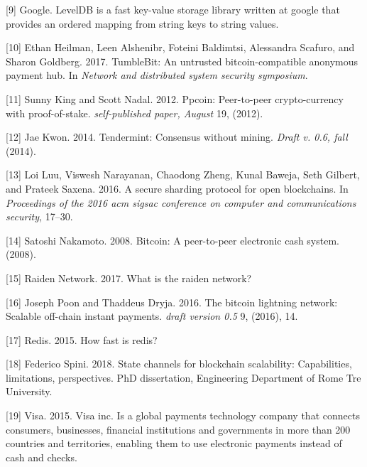 \documentclass[12pt,italian,]{book}
\begin{document}
\leavevmode\hypertarget{ref-googlele43:online}{}%
{[}9{]} Google. LevelDB is a fast key-value storage library written at google that provides an ordered mapping from string keys to string values.

\leavevmode\hypertarget{ref-heilman2017tumblebit}{}%
{[}10{]} Ethan Heilman, Leen Alshenibr, Foteini Baldimtsi, Alessandra Scafuro, and Sharon Goldberg. 2017. TumbleBit: An untrusted bitcoin-compatible anonymous payment hub. In \emph{Network and distributed system security symposium}.

\leavevmode\hypertarget{ref-king2012ppcoin}{}%
{[}11{]} Sunny King and Scott Nadal. 2012. Ppcoin: Peer-to-peer crypto-currency with proof-of-stake. \emph{self-published paper, August} 19, (2012).

\leavevmode\hypertarget{ref-kwon2014tendermint}{}%
{[}12{]} Jae Kwon. 2014. Tendermint: Consensus without mining. \emph{Draft v. 0.6, fall} (2014).

\leavevmode\hypertarget{ref-luu2016secure}{}%
{[}13{]} Loi Luu, Viswesh Narayanan, Chaodong Zheng, Kunal Baweja, Seth Gilbert, and Prateek Saxena. 2016. A secure sharding protocol for open blockchains. In \emph{Proceedings of the 2016 acm sigsac conference on computer and communications security}, 17--30.

\leavevmode\hypertarget{ref-nakamoto2008bitcoin}{}%
{[}14{]} Satoshi Nakamoto. 2008. Bitcoin: A peer-to-peer electronic cash system. (2008).

\leavevmode\hypertarget{ref-raiden101:online}{}%
{[}15{]} Raiden Network. 2017. What is the raiden network?

\leavevmode\hypertarget{ref-poon2016bitcoin}{}%
{[}16{]} Joseph Poon and Thaddeus Dryja. 2016. The bitcoin lightning network: Scalable off-chain instant payments. \emph{draft version 0.5} 9, (2016), 14.

\leavevmode\hypertarget{ref-Howfasti99:online}{}%
{[}17{]} Redis. 2015. How fast is redis?

\leavevmode\hypertarget{ref-Spini2018}{}%
{[}18{]} Federico Spini. 2018. State channels for blockchain scalability: Capabilities, limitations, perspectives. PhD dissertation, Engineering Department of Rome Tre University.

\leavevmode\hypertarget{ref-VISA2015:online}{}%
{[}19{]} Visa. 2015. Visa inc. Is a global payments technology company that connects consumers, businesses, financial institutions and governments in more than 200 countries and territories, enabling them to use electronic payments instead of cash and checks.
\end{document}
